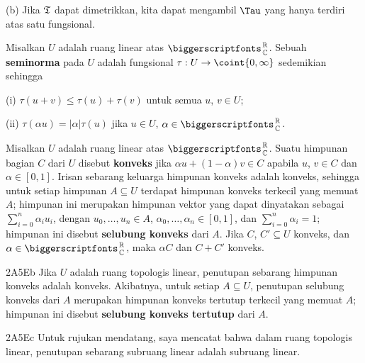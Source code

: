 (b) Jika $\frak T$ dapat dimetrikkan, kita dapat mengambil $\Tau$
yang hanya terdiri atas satu fungsional.


 Misalkan $U$ adalah ruang linear atas
$\RoverC$. Sebuah {\bf seminorma} pada $U$ adalah fungsional
$\tau:U\to\coint{0,\infty}$ sedemikian sehingga

\quad (i) $\tau(u+v)\le\tau(u)+\tau(v)$ untuk semua $u$, $v\in U$;

\quad (ii) $\tau(\alpha u)=|\alpha|\tau(u)$ jika $u\in U$,
$\alpha\in\RoverC$.


 Misalkan $U$ adalah ruang linear
atas $\RoverC$. Suatu himpunan bagian $C$ dari $U$ disebut
{\bf konveks} jika $\alpha u+(1-\alpha)v\in C$ apabila $u$, $v\in C$
dan $\alpha\in[0,1]$. Irisan sebarang keluarga himpunan konveks adalah
konveks, sehingga untuk setiap himpunan $A\subseteq U$ terdapat
himpunan konveks terkecil yang memuat $A$; himpunan ini
merupakan himpunan vektor yang dapat dinyatakan sebagai
$\sum_{i=0}^n\alpha_iu_i$, dengan
$u_0,\ldots,u_n\in A$, $\alpha_0,\ldots,\alpha_n\in[0,1]$, dan
$\sum_{i=0}^n\alpha_i=1$;
himpunan ini disebut {\bf selubung konveks} dari $A$. Jika
$C$, $C'\subseteq U$ konveks, dan $\alpha\in\RoverC$, maka
$\alpha C$ dan $C+C'$ konveks.

\spheader 2A5Eb Jika $U$ adalah ruang topologis linear, penutupan
sebarang himpunan konveks adalah konveks. Akibatnya, untuk setiap $A\subseteq U$,
penutupan selubung konveks dari $A$ merupakan himpunan konveks tertutup
terkecil yang memuat $A$; himpunan ini disebut
{\bf selubung konveks tertutup} dari $A$.

\spheader 2A5Ec Untuk rujukan mendatang, saya mencatat bahwa dalam
ruang topologis linear, penutupan sebarang subruang linear adalah
subruang linear.


